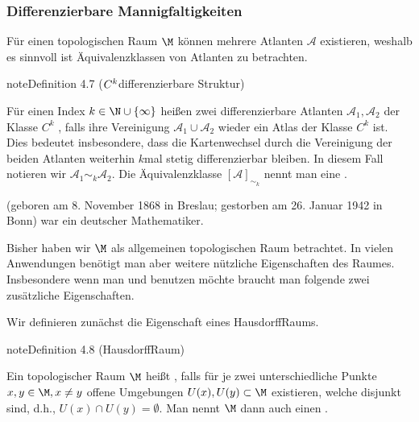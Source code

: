 \documentclass[letterpaper,10pt,english]{jupyterBook}
\begin{document}
\subsubsection{Differenzierbare Mannigfaltigkeiten}
\label{\detokenize{manifolds/manifolds_prelim:differenzierbare-mannigfaltigkeiten}}
\sphinxAtStartPar
Für einen topologischen Raum \(\M\) können mehrere Atlanten \(\mathcal{A}\) existieren, weshalb es sinnvoll ist Äquivalenzklassen von Atlanten zu betrachten.
\label{manifolds/manifolds_prelim:definition-9}
\begin{sphinxadmonition}{note}{Definition 4.7 (\protect\(C^k\protect\)\sphinxhyphen{}differenzierbare Struktur)}



\sphinxAtStartPar
Für einen Index \(k\in \N \cup \{\infty\}\) heißen zwei differenzierbare Atlanten \(\mathcal{A}_1, \mathcal{A}_2\) der Klasse \(C^k\) , falls ihre Vereinigung \(\mathcal{A}_1\cup \mathcal{A}_2\) wieder ein Atlas der Klasse \(C^k\) ist.
Dies bedeutet insbesondere, dass die Kartenwechsel durch die Vereinigung der beiden Atlanten weiterhin \(k\)\sphinxhyphen{}mal stetig differenzierbar bleiben.
In diesem Fall notieren wir \(\mathcal{A}_1\sim_k \mathcal{A}_2\).
Die Äquivalenzklasse \([\mathcal{A}]_{\sim_k}\) nennt man eine .
\end{sphinxadmonition}

\begin{sphinxShadowBox}
\sphinxstylesidebartitle{}

\sphinxAtStartPar
{} (geboren am 8. November 1868 in Breslau; gestorben am 26. Januar 1942 in Bonn) war ein deutscher Mathematiker.
\end{sphinxShadowBox}

\sphinxAtStartPar
Bisher haben wir \(\M\) als allgemeinen topologischen Raum betrachtet.
In vielen Anwendungen benötigt man aber weitere nützliche Eigenschaften des Raumes.
Insbesondere wenn man  und  benutzen möchte braucht man folgende zwei zusätzliche Eigenschaften.

\sphinxAtStartPar
Wir definieren zunächst die Eigenschaft eines Hausdorff\sphinxhyphen{}Raums.
\label{manifolds/manifolds_prelim:def:hausdorffraum}
\begin{sphinxadmonition}{note}{Definition 4.8 (Hausdorff\sphinxhyphen{}Raum)}



\sphinxAtStartPar
Ein topologischer Raum \(\M\) heißt , falls für je zwei unterschiedliche Punkte \(x,y\in \M, x\neq y\) offene Umgebungen \(U(x), U(y) \subset \M\) existieren, welche disjunkt sind, d.h., \(U(x)\cap U(y) = \emptyset\).
Man nennt \(\M\) dann auch einen .
\end{sphinxadmonition}
\end{document}
